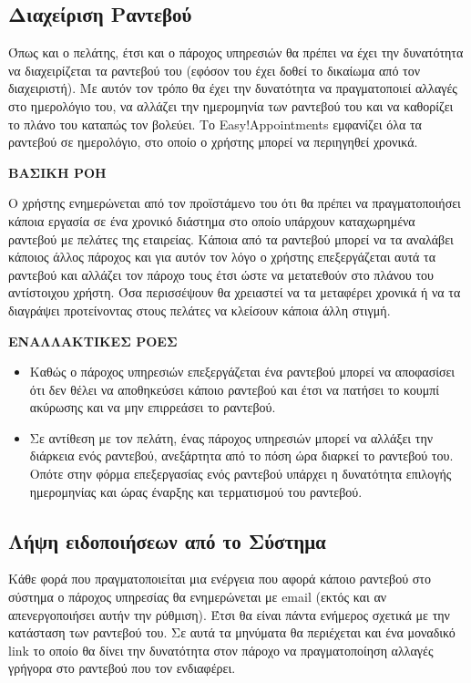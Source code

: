 \subsection {Διαχείριση Ραντεβού}
Όπως και ο πελάτης, έτσι και ο πάροχος υπηρεσιών θα πρέπει να έχει την δυνατότητα να διαχειρίζεται τα ραντεβού του (εφόσον του έχει δοθεί το δικαίωμα από τον διαχειριστή). Με αυτόν τον τρόπο θα έχει την δυνατότητα να πραγματοποιεί αλλαγές στο ημερολόγιο του, να αλλάζει την ημερομηνία των ραντεβού του και να καθορίζει το πλάνο του καταπώς τον βολεύει. Το Easy!Appointments εμφανίζει όλα τα ραντεβού σε ημερολόγιο, στο οποίο ο χρήστης μπορεί να περιηγηθεί χρονικά.

\textbf{ΒΑΣΙΚΗ ΡΟΗ}

Ο χρήστης ενημερώνεται από τον προϊστάμενο του ότι θα πρέπει να πραγματοποιήσει κάποια εργασία σε ένα χρονικό διάστημα στο οποίο υπάρχουν καταχωρημένα ραντεβού με πελάτες της εταιρείας. Κάποια από τα ραντεβού μπορεί να τα αναλάβει κάποιος άλλος πάροχος και για αυτόν τον λόγο ο χρήστης επεξεργάζεται αυτά τα ραντεβού και αλλάζει τον πάροχο τους έτσι ώστε να μετατεθούν στο πλάνου του αντίστοιχου χρήστη. Όσα περισσέψουν θα χρειαστεί να τα μεταφέρει χρονικά ή να τα διαγράψει προτείνοντας στους πελάτες να κλείσουν κάποια άλλη στιγμή.

\textbf{ΕΝΑΛΛΑΚΤΙΚΕΣ ΡΟΕΣ}

\begin{itemize}
\item Καθώς ο πάροχος υπηρεσιών επεξεργάζεται ένα ραντεβού μπορεί να αποφασίσει ότι δεν θέλει να αποθηκεύσει κάποιο ραντεβού και έτσι να πατήσει το κουμπί ακύρωσης και να μην επιρρεάσει το ραντεβού.
\item Σε αντίθεση με τον πελάτη, ένας πάροχος υπηρεσιών μπορεί να αλλάξει την διάρκεια ενός ραντεβού, ανεξάρτητα από το πόση ώρα διαρκεί το ραντεβού του. Οπότε στην φόρμα επεξεργασίας ενός ραντεβού υπάρχει η δυνατότητα επιλογής ημερομηνίας και ώρας έναρξης και τερματισμού του ραντεβού.
\end{itemize}

\subsection{Λήψη ειδοποιήσεων από το Σύστημα}
Κάθε φορά που πραγματοποιείται μια ενέργεια που αφορά κάποιο ραντεβού στο σύστημα ο πάροχος υπηρεσίας θα ενημερώνεται με email (εκτός και αν απενεργοποιήσει αυτήν την ρύθμιση). Έτσι θα είναι πάντα ενήμερος σχετικά με την κατάσταση των ραντεβού του. Σε αυτά τα μηνύματα θα περιέχεται και ένα μοναδικό link το οποίο θα δίνει την δυνατότητα στον πάροχο να πραγματοποίηση αλλαγές γρήγορα στο ραντεβού που τον ενδιαφέρει.

